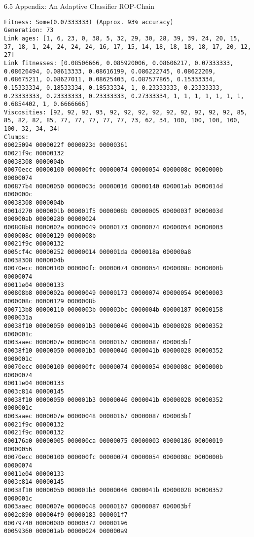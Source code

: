 \documentclass[9pt]{beamer}
\begin{document}
\begin{frame}[fragile]{6.5 Appendix: An Adaptive Classifier ROP-Chain}
\tiny

\begin{verbatim}
Fitness: Some(0.07333333) (Approx. 93% accuracy)
Generation: 73
Link ages: [1, 6, 23, 0, 38, 5, 32, 29, 30, 28, 39, 39, 24, 20, 15, 37, 18, 1, 24, 24, 24, 24, 16, 17, 15, 14, 18, 18, 18, 18, 17, 20, 12, 27]
Link fitnesses: [0.08506666, 0.085920006, 0.08606217, 0.07333333, 0.08626494, 0.08613333, 0.08616199, 0.086222745, 0.08622269, 0.08675211, 0.08627011, 0.08625403, 0.087577865, 0.15333334, 0.15333334, 0.18533334, 0.18533334, 1, 0.23333333, 0.23333333, 0.23333333, 0.23333333, 0.23333333, 0.27333334, 1, 1, 1, 1, 1, 1, 1, 0.6854402, 1, 0.6666666]
Viscosities: [92, 92, 92, 93, 92, 92, 92, 92, 92, 92, 92, 92, 92, 85, 85, 82, 82, 85, 77, 77, 77, 77, 77, 73, 62, 34, 100, 100, 100, 100, 100, 32, 34, 34]
Clumps:
00025094 0000022f 0000023d 00000361 
00021f9c 00000132 
00038308 0000004b 
00070ecc 00000100 000000fc 00000074 00000054 0000008c 0000000b 00000074 
000877b4 00000050 0000003d 00000016 00000140 000001ab 0000014d 0000000c 
00038308 0000004b 
0001d270 0000001b 000001f5 0000008b 00000005 0000003f 0000003d 000000ab 00000280 00000024 
000808b8 0000002a 00000049 00000173 00000074 00000054 00000003 0000008c 00000129 0000008b 
00021f9c 00000132 
0005cf4c 00000252 00000014 000001da 0000018a 000000a8 
00038308 0000004b 
00070ecc 00000100 000000fc 00000074 00000054 0000008c 0000000b 00000074 
00011e04 00000133 
000808b8 0000002a 00000049 00000173 00000074 00000054 00000003 0000008c 00000129 0000008b 
000713b8 00000110 0000003b 000003bc 0000004b 00000187 00000158 0000031a 
00038f10 00000050 000001b3 00000046 0000041b 00000028 00000352 0000001c 
0003aaec 0000007e 00000048 00000167 00000087 000003bf 
00038f10 00000050 000001b3 00000046 0000041b 00000028 00000352 0000001c 
00070ecc 00000100 000000fc 00000074 00000054 0000008c 0000000b 00000074 
00011e04 00000133 
0003c814 00000145 
00038f10 00000050 000001b3 00000046 0000041b 00000028 00000352 0000001c 
0003aaec 0000007e 00000048 00000167 00000087 000003bf 
00021f9c 00000132 
00021f9c 00000132 
000176a0 00000005 000000ca 00000075 00000003 00000186 00000019 00000056 
00070ecc 00000100 000000fc 00000074 00000054 0000008c 0000000b 00000074 
00011e04 00000133 
0003c814 00000145 
00038f10 00000050 000001b3 00000046 0000041b 00000028 00000352 0000001c 
0003aaec 0000007e 00000048 00000167 00000087 000003bf 
0002e890 000004f9 00000183 000001f7 
00079740 00000080 00000372 00000196 
00059360 000001ab 00000024 000000a9 

\end{verbatim}
\end{frame}
\end{document}
